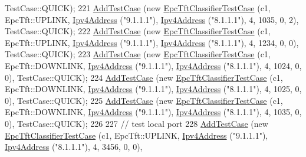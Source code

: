 \begin{DoxyCode}
      TestCase::QUICK);
221   \hyperlink{classns3_1_1TestCase_a3718088e3eefd5d6454569d2e0ddd835}{AddTestCase} (\textcolor{keyword}{new} \hyperlink{classEpcTftClassifierTestCase}{EpcTftClassifierTestCase} (c1, EpcTft::UPLINK,   
      \hyperlink{classns3_1_1Ipv4Address}{Ipv4Address} (\textcolor{stringliteral}{"9.1.1.1"}), \hyperlink{classns3_1_1Ipv4Address}{Ipv4Address} (\textcolor{stringliteral}{"8.1.1.1"}),     4,     1035,     0,    2), 
      TestCase::QUICK);
222   \hyperlink{classns3_1_1TestCase_a3718088e3eefd5d6454569d2e0ddd835}{AddTestCase} (\textcolor{keyword}{new} \hyperlink{classEpcTftClassifierTestCase}{EpcTftClassifierTestCase} (c1, EpcTft::UPLINK,   
      \hyperlink{classns3_1_1Ipv4Address}{Ipv4Address} (\textcolor{stringliteral}{"9.1.1.1"}), \hyperlink{classns3_1_1Ipv4Address}{Ipv4Address} (\textcolor{stringliteral}{"8.1.1.1"}),     4,     1234,     0,    0), 
      TestCase::QUICK);
223   \hyperlink{classns3_1_1TestCase_a3718088e3eefd5d6454569d2e0ddd835}{AddTestCase} (\textcolor{keyword}{new} \hyperlink{classEpcTftClassifierTestCase}{EpcTftClassifierTestCase} (c1, EpcTft::DOWNLINK, 
      \hyperlink{classns3_1_1Ipv4Address}{Ipv4Address} (\textcolor{stringliteral}{"9.1.1.1"}), \hyperlink{classns3_1_1Ipv4Address}{Ipv4Address} (\textcolor{stringliteral}{"8.1.1.1"}),     4,     1024,     0,    0), 
      TestCase::QUICK);
224   \hyperlink{classns3_1_1TestCase_a3718088e3eefd5d6454569d2e0ddd835}{AddTestCase} (\textcolor{keyword}{new} \hyperlink{classEpcTftClassifierTestCase}{EpcTftClassifierTestCase} (c1, EpcTft::DOWNLINK, 
      \hyperlink{classns3_1_1Ipv4Address}{Ipv4Address} (\textcolor{stringliteral}{"9.1.1.1"}), \hyperlink{classns3_1_1Ipv4Address}{Ipv4Address} (\textcolor{stringliteral}{"8.1.1.1"}),     4,     1025,     0,    0), 
      TestCase::QUICK);
225   \hyperlink{classns3_1_1TestCase_a3718088e3eefd5d6454569d2e0ddd835}{AddTestCase} (\textcolor{keyword}{new} \hyperlink{classEpcTftClassifierTestCase}{EpcTftClassifierTestCase} (c1, EpcTft::DOWNLINK, 
      \hyperlink{classns3_1_1Ipv4Address}{Ipv4Address} (\textcolor{stringliteral}{"9.1.1.1"}), \hyperlink{classns3_1_1Ipv4Address}{Ipv4Address} (\textcolor{stringliteral}{"8.1.1.1"}),     4,     1035,     0,    0), 
      TestCase::QUICK);
226 
227   \textcolor{comment}{// test local port}
228   \hyperlink{classns3_1_1TestCase_a3718088e3eefd5d6454569d2e0ddd835}{AddTestCase} (\textcolor{keyword}{new} \hyperlink{classEpcTftClassifierTestCase}{EpcTftClassifierTestCase} (c1, EpcTft::UPLINK,   
      \hyperlink{classns3_1_1Ipv4Address}{Ipv4Address} (\textcolor{stringliteral}{"9.1.1.1"}), \hyperlink{classns3_1_1Ipv4Address}{Ipv4Address} (\textcolor{stringliteral}{"8.1.1.1"}),     4,     3456,     0,    0), 

\end{DoxyCode}
